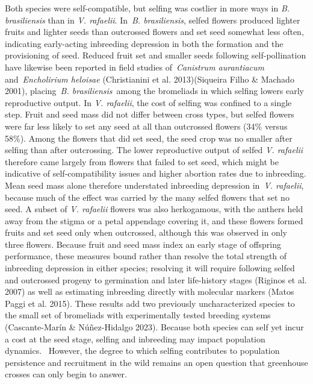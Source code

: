 \documentclass[
]{article}
\begin{document}
Both species were self-compatible, but selfing was costlier in more ways
in \emph{B. brasiliensis} than in \emph{V. rafaelii}. In~\emph{B.
brasiliensis}, selfed flowers produced lighter fruits and lighter seeds
than outcrossed flowers and set seed somewhat less often, indicating
early-acting inbreeding depression in both the formation and the
provisioning of seed. Reduced fruit set and smaller seeds following
self-pollination have likewise been reported in field studies
of~\emph{Canistrum aurantiacum} and~\emph{Encholirium heloisae}
(Christianini et al. 2013)(Siqueira Filho \& Machado 2001),
placing~\emph{B. brasiliensis}~among the bromeliads in which selfing
lowers early reproductive output. In \emph{V. rafaelii}, the cost of
selfing was confined to a single step. Fruit and seed mass did not
differ between cross types, but selfed flowers were far less likely to
set any seed at all than outcrossed flowers (34\% versus 58\%). Among
the flowers that did set seed, the seed crop was no smaller after
selfing than after outcrossing. The lower reproductive output of selfed
\emph{V. rafaelii} therefore came largely from flowers that failed to
set seed, which might be indicative of self-compatibility issues and
higher abortion rates due to inbreeding. Mean seed mass alone therefore
understated inbreeding depression in~\emph{V. rafaelii}, because much of
the effect was carried by the many selfed flowers that set no seed. A
subset of \emph{V. rafaelii} flowers was also herkogamous, with the
anthers held away from the stigma or a petal appendage covering it, and
these flowers formed fruits and set seed only when outcrossed, although
this was observed in only three flowers. Because fruit and seed mass
index an early stage of offspring performance, these measures bound
rather than resolve the total strength of inbreeding depression in
either species; resolving it will require following selfed and
outcrossed progeny to germination and later life-history stages (Riginos
et al. 2007) as well as estimating inbreeding directly with molecular
markers (Matos Paggi et al. 2015). These results add two previously
uncharacterized species to the small set of bromeliads with
experimentally tested breeding systems (Cascante-Marín \& Núñez-Hidalgo
2023). Because both species can self yet incur a cost at the seed stage,
selfing and inbreeding may impact population dynamics.~ However, the
degree to which selfing contributes to population persistence and
recruitment in the wild remains an open question that greenhouse crosses
can only begin to answer.
\end{document}
